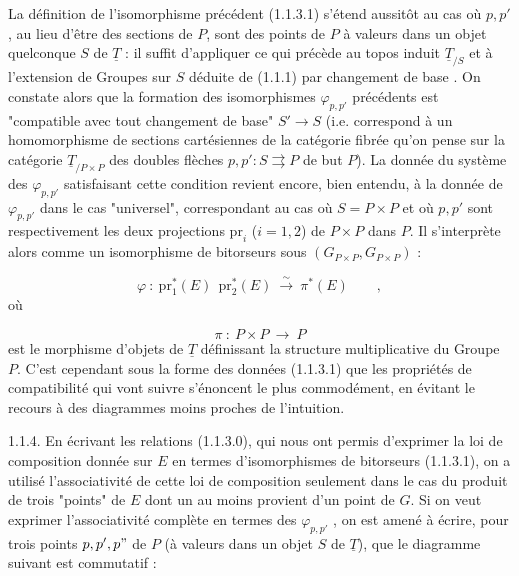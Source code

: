 La définition de l'isomorphisme précédent (1.1.3.1) s'étend aussitôt au cas où $p,p'$, au lieu d'être des sections de $P$, sont des points de $P$ à valeurs dans un objet quelconque $S$ de $\underline{T}$ : il suffit d'appliquer ce qui précède au topos induit $\underline{T}_{/S}$ et à l'extension de Groupes sur $S$ déduite de (1.1.1) par changement de base . On constate alors que la formation des isomorphismes $\varphi_{p,p'}$ précédents est "compatible avec tout changement de base" $S' \longrightarrow S$ (i.e. correspond à un homomorphisme de sections cartésiennes de la catégorie fibrée qu'on pense sur la catégorie $\underline{T}_{/P\times P}$ des doubles flèches $p,p' : S \rightrightarrows P$ de but $P$). La donnée du système des $\varphi_{p,p'}$ satisfaisant cette condition revient encore, bien entendu, à la donnée de $\varphi_{p,p'}$ dans le cas "universel", correspondant au cas où $S = P\times P$ et où $p,p'$ sont respectivement les deux projections $\mathrm{pr}_i$ ($i=1,2$) de $P\times P$ dans $P$. Il s'interprète alors comme un isomorphisme de bitorseurs sous $(G_{P\times P},G_{P\times P})$ :

\begin{equation}\tag{1.1.3.2}
\varphi \ :\ \mathrm{pr}_1^*(E)\ \ \mathrm{pr}_2^*(E)\ \overset{\sim}{\longrightarrow}\ \pi^*(E) \qquad ,
\end{equation}
où

\begin{equation*}
\pi \ :\ P\times P \ \longrightarrow\ P
\end{equation*}
est le morphisme d'objets de $\underline{T}$ définissant la structure multiplicative du Groupe $P$. C'est cependant sous la forme des données (1.1.3.1) que les propriétés de compatibilité qui vont suivre s'énoncent le plus commodément, en évitant le recours à des diagrammes moins proches de l'intuition.



1.1.4.  En écrivant les relations (1.1.3.0), qui nous ont permis d'exprimer la loi de composition donnée sur $E$ en termes d'isomorphismes de bitorseurs (1.1.3.1), on a utilisé l'associativité de cette loi de composition seulement dans le cas du produit de trois "points" de $E$ dont un au moins provient d'un point de $G$. Si on veut exprimer l'associativité complète en termes des $\varphi_{p,p'}$ , on est amené à écrire, pour trois points $p,p',p"$ de $P$ (à valeurs dans un objet $S$ de $\underline{T}$), que le diagramme suivant est commutatif :

